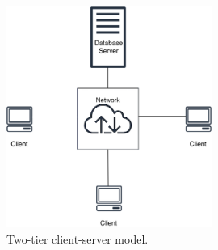 \documentclass{article}
\begin{document}
\newpage

 

\begin{figure}[h!]
 \centering
     \includegraphics[width=0.6\textwidth]{figs/Client_Server.png}
    \caption{Two-tier client-server model.}
    \label{fig:dbarc2}
\end{figure}

 







  



 
\end{document}
